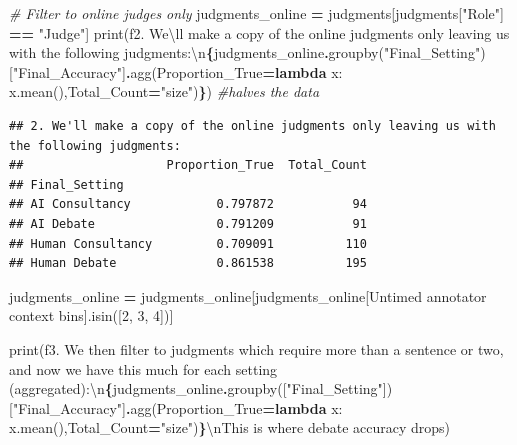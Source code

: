 \documentclass[
]{article}
\newenvironment{Shaded}{\begin{snugshade}}{\end{snugshade}}
\newcommand{\BuiltInTok}[1]{#1}
\newcommand{\CharTok}[1]{\textcolor[rgb]{0.31,0.60,0.02}{#1}}
\newcommand{\CommentTok}[1]{\textcolor[rgb]{0.56,0.35,0.01}{\textit{#1}}}
\newcommand{\KeywordTok}[1]{\textcolor[rgb]{0.13,0.29,0.53}{\textbf{#1}}}
\newcommand{\NormalTok}[1]{#1}
\newcommand{\OperatorTok}[1]{\textcolor[rgb]{0.81,0.36,0.00}{\textbf{#1}}}
\newcommand{\SpecialCharTok}[1]{\textcolor[rgb]{0.81,0.36,0.00}{\textbf{#1}}}
\newcommand{\SpecialStringTok}[1]{\textcolor[rgb]{0.31,0.60,0.02}{#1}}
\newcommand{\StringTok}[1]{\textcolor[rgb]{0.31,0.60,0.02}{#1}}
\begin{document}
\begin{Shaded}
\begin{Highlighting}[]
\CommentTok{\# Filter to online judges only}
\NormalTok{judgments\_online }\OperatorTok{=}\NormalTok{ judgments[judgments[}\StringTok{"Role"}\NormalTok{] }\OperatorTok{==} \StringTok{"Judge"}\NormalTok{]}
\BuiltInTok{print}\NormalTok{(}\SpecialStringTok{f\textquotesingle{}2. We}\CharTok{\textbackslash{}\textquotesingle{}}\SpecialStringTok{ll make a copy of the online judgments only leaving us with the following judgments:}\CharTok{\textbackslash{}n}\SpecialCharTok{\{}\NormalTok{judgments\_online}\SpecialCharTok{.}\NormalTok{groupby(}\StringTok{"Final\_Setting"}\NormalTok{)[}\StringTok{"Final\_Accuracy"}\NormalTok{]}\SpecialCharTok{.}\NormalTok{agg(Proportion\_True}\OperatorTok{=}\KeywordTok{lambda}\NormalTok{ x: x.mean(),Total\_Count}\OperatorTok{=}\StringTok{"size"}\NormalTok{)}\SpecialCharTok{\}}\SpecialStringTok{\textquotesingle{}}\NormalTok{) }\CommentTok{\#halves the data}
\end{Highlighting}
\end{Shaded}

\begin{verbatim}
## 2. We'll make a copy of the online judgments only leaving us with the following judgments:
##                    Proportion_True  Total_Count
## Final_Setting                                  
## AI Consultancy            0.797872           94
## AI Debate                 0.791209           91
## Human Consultancy         0.709091          110
## Human Debate              0.861538          195
\end{verbatim}

\begin{Shaded}
\begin{Highlighting}[]
\NormalTok{judgments\_online }\OperatorTok{=}\NormalTok{ judgments\_online[judgments\_online[}\StringTok{\textquotesingle{}Untimed annotator context bins\textquotesingle{}}\NormalTok{].isin([}\StringTok{\textquotesingle{}2\textquotesingle{}}\NormalTok{, }\StringTok{\textquotesingle{}3\textquotesingle{}}\NormalTok{, }\StringTok{\textquotesingle{}4\textquotesingle{}}\NormalTok{])]}

\BuiltInTok{print}\NormalTok{(}\SpecialStringTok{f\textquotesingle{}3. We then filter to judgments which require more than a sentence or two, and now we have this much for each setting (aggregated):}\CharTok{\textbackslash{}n}\SpecialCharTok{\{}\NormalTok{judgments\_online}\SpecialCharTok{.}\NormalTok{groupby([}\StringTok{"Final\_Setting"}\NormalTok{])[}\StringTok{"Final\_Accuracy"}\NormalTok{]}\SpecialCharTok{.}\NormalTok{agg(Proportion\_True}\OperatorTok{=}\KeywordTok{lambda}\NormalTok{ x: x.mean(),Total\_Count}\OperatorTok{=}\StringTok{"size"}\NormalTok{)}\SpecialCharTok{\}}\CharTok{\textbackslash{}n}\SpecialStringTok{This is where debate accuracy drops\textquotesingle{}}\NormalTok{)}
\end{Highlighting}
\end{Shaded}
\end{document}
